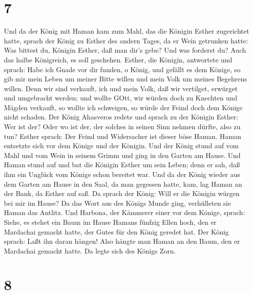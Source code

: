 \hypertarget{section-6}{%
\section{7}\label{section-6}}

 Und da der König mit Haman kam zum Mahl, das die Königin
Esther zugerichtet hatte,  sprach der König zu Esther des
andern Tages, da er Wein getrunken hatte: Was bittest du, Königin
Esther, daß man dir's gebe? Und was forderst du? Auch das halbe
Königreich, es soll geschehen.  Esther, die Königin,
antwortete und sprach: Habe ich Gnade vor dir funden, o König, und
gefällt es dem Könige, so gib mir mein Leben um meiner Bitte willen und
mein Volk um meines Begehrens willen.  Denn wir sind
verkauft, ich und mein Volk, daß wir vertilget, erwürget und umgebracht
werden; und wollte GOtt, wir würden doch zu Knechten und Mägden
verkauft, so wollte ich schweigen, so würde der Feind doch dem Könige
nicht schaden.  Der König Ahasveros redete und sprach zu der
Königin Esther: Wer ist der? Oder wo ist der, der solches in seinen Sinn
nehmen dürfte, also zu tun?  Esther sprach: Der Feind und
Widersacher ist dieser böse Haman. Haman entsetzte sich vor dem Könige
und der Königin.  Und der König stund auf vom Mahl und vom
Wein in seinem Grimm und ging in den Garten am Hause. Und Haman stund
auf und bat die Königin Esther um sein Leben; denn er sah, daß ihm ein
Unglück vom Könige schon bereitet war.  Und da der König
wieder aus dem Garten am Hause in den Saal, da man gegessen hatte, kam,
lag Haman an der Bank, da Esther auf saß. Da sprach der König: Will er
die Königin würgen bei mir im Hause? Da das Wort aus des Königs Munde
ging, verhülleten sie Haman das Antlitz.  Und Harbona, der
Kämmerer einer vor dem Könige, sprach: Siehe, es stehet ein Baum im
Hause Hamans fünfzig Ellen hoch, den er Mardachai gemacht hatte, der
Gutes für den König geredet hat. Der König sprach: Laßt ihn daran
hängen!  Also hängte man Haman an den Baum, den er
Mardachai gemacht hatte. Da legte sich des Königs Zorn.

\hypertarget{section-7}{%
\section{8}\label{section-7}}

